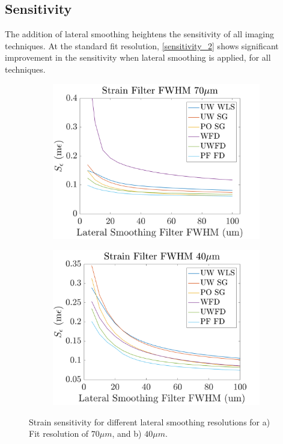 \subsection{Sensitivity}

The addition of lateral smoothing heightens the sensitivity of all imaging techniques. At the standard fit resolution, \autoref{sensitivity_2} shows significant improvement in the sensitivity when lateral smoothing is applied, for all techniques.

\begin{figure}[b!]
	\centering
    \begin{subfigure}{0.49\textwidth}
    	\centering
        \includegraphics[width=\textwidth]{figures/sensitivity_fr70.png}
    \end{subfigure}
    \begin{subfigure}{0.49\textwidth}
    	\centering
        \includegraphics[width=\textwidth]{figures/sensitivity_fr40.png}
    \end{subfigure}
    \caption{Strain sensitivity for different lateral smoothing resolutions for a) Fit resolution of $70\mu m$, and b) $40\mu m$.}
    \label{sensitivity_2}	
\end{figure}


